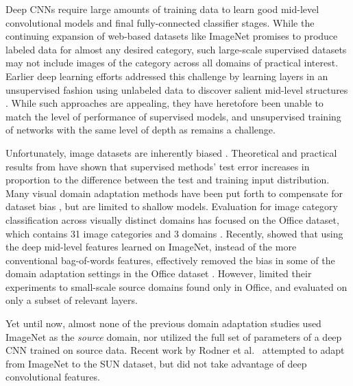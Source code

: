 Deep CNNs require large amounts of training data to learn
good mid-level convolutional models and final fully-connected classifier
stages. While the continuing expansion of web-based datasets like
ImageNet \cite{ilsvrc2012} promises to produce labeled data for almost any desired
category, such large-scale supervised datasets
may not include images of the category across all
domains of practical interest. Earlier deep learning efforts addressed this
challenge by learning layers in an unsupervised fashion using unlabeled data to
discover salient mid-level structures \cite{coates-nips12, dean-nips12}. While such approaches are appealing, they
have heretofore been unable to match the level of performance of supervised
models, and unsupervised training of networks with the same level of depth
as \cite{supervision} remains a challenge.

 
Unfortunately, image datasets are inherently biased \cite{efros-cvpr11}. 
Theoretical \cite{ben2007analysis, blitzer2007learning} and practical results from \cite{saenko-eccv10,efros-cvpr11} have shown that supervised methods' test error increases in proportion to the difference between the test and training input distribution. 
Many visual domain adaptation methods have been put forth to compensate for dataset bias \cite{daume,yang-icdm07,aytar-iccv11,saenko-eccv10,kulis-cvpr11,Khosla-eccv12,gopalan-iccv11,gong-cvpr12,hoffman-eccv12,hoffman-iclr13}, but are limited to shallow models. 
Evaluation for image category classification across visually distinct domains has focused on the Office dataset, which contains 31 image categories and 3 domains \cite{saenko-eccv10}. 
Recently, \cite{deeplearning-arxiv-2013} showed that using the deep mid-level features learned on ImageNet, instead of the more conventional bag-of-words features, effectively removed the bias in some of the domain adaptation settings in the Office dataset \cite{saenko-eccv10}.
However, \cite{deeplearning-arxiv-2013} limited their experiments to
small-scale source domains found only in Office, and evaluated on only a subset
of relevant layers.

Yet until now, almost none of the previous domain adaptation studies used ImageNet as the \textit{source} domain, nor utilized the full set of parameters of a deep CNN trained on source data. Recent work by Rodner et al.~\cite{rodner-arxiv13} attempted to adapt from ImageNet to the SUN dataset, but did not take advantage of deep convolutional features. 

